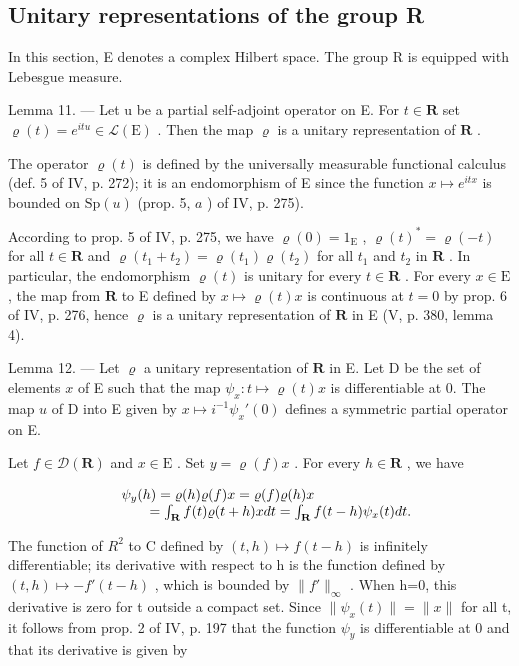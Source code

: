 \subsection{Unitary representations of the group R}

In this section, E denotes a complex Hilbert space. The group R is equipped with Lebesgue measure.

Lemma 11. --- Let u be a partial self-adjoint operator on E. For \(t \in \mathbf{R}\) set \(\varrho(t) = e^{itu} \in \mathcal{L}(\mathrm{E})\) . Then the map \(\varrho\) is a unitary representation of \(\mathbf{R}\) .

The operator \(\varrho(t)\) is defined by the universally measurable functional calculus (def. 5 of IV, p. 272); it is an endomorphism of E since the function \(x \mapsto e^{itx}\) is bounded on \(\mathrm{Sp}(u)\) (prop. 5, \(a\) ) of IV, p. 275).

According to prop. 5 of IV, p. 275, we have \(\varrho(0) = 1_{\mathrm{E}}\) , \(\varrho(t)^* = \varrho(-t)\) for all \(t \in \mathbf{R}\) and \(\varrho(t_1 + t_2) = \varrho(t_1)\varrho(t_2)\) for all \(t_1\) and \(t_2\) in \(\mathbf{R}\) . In particular, the endomorphism \(\varrho(t)\) is unitary for every \(t \in \mathbf{R}\) . For every \(x \in \mathrm{E}\) , the map from \(\mathbf{R}\) to E defined by \(x \mapsto \varrho(t)x\) is continuous at \(t = 0\) by prop. 6 of IV, p. 276, hence \(\varrho\) is a unitary representation of \(\mathbf{R}\) in E (V, p. 380, lemma 4).

Lemma 12. --- Let \(\varrho\) a unitary representation of \(\mathbf{R}\) in E. Let D be the set of elements \(x\) of E such that the map \(\psi_x: t \mapsto \varrho(t)x\) is differentiable at 0. The map \(u\) of D into E given by \(x \mapsto i^{-1} \psi_x'(0)\) defines a symmetric partial operator on E.

Let \(f \in \mathcal{D}(\mathbf{R})\) and \(x \in \mathrm{E}\) . Set \(y = \varrho(f)x\) . For every \(h \in \mathbf{R}\) , we have

\[
\begin{array}{r l} & {\psi_ {y} (h) = \varrho (h) \varrho (f) x = \varrho (f) \varrho (h) x} \\ & {\qquad = \int_ {\mathbf {R}} f (t) \varrho (t + h) x d t = \int_ {\mathbf {R}} f (t - h) \psi_ {x} (t) d t.} \end{array}
\]

The function of \(R^{2}\) to C defined by \((t,h)\mapsto f(t-h)\) is infinitely differentiable; its derivative with respect to h is the function defined by \((t,h)\mapsto -f'(t-h)\) , which is bounded by \(\|f'\|_{\infty}\) . When h=0, this derivative is zero for t outside a compact set. Since \(\|\psi_{x}(t)\|=\|x\|\) for all t, it follows from prop. 2 of IV, p. 197 that the function \(\psi_{y}\) is differentiable at 0 and that its derivative is given by

